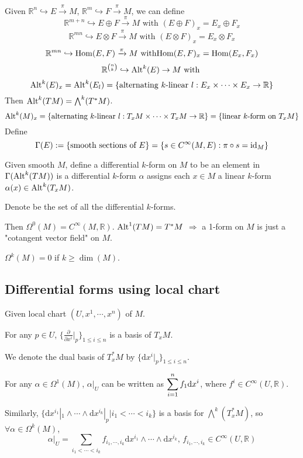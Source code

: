 Given  $ \mathbb{R}^n\hookrightarrow E\xrightarrow{\pi}M $,  $ \mathbb{R}^m\hookrightarrow F\xrightarrow{\pi}M $, we can define 
\[\mathbb{R}^{m+n}\hookrightarrow E\oplus F\xrightarrow{\pi}M\text{ with }(E\oplus F)_x=E_x\oplus F_x\]
\[\mathbb{R}^{mn}\hookrightarrow E\otimes F\xrightarrow{\pi}M\text{ with }(E\otimes F)_x=E_x\otimes F_x\]  
\[\mathbb{R}^{mn}\hookrightarrow \Hom(E,F)\xrightarrow{\pi}M\text{\ with}\Hom(E,F)_x=\Hom(E_x,F_x)\]
\[\mathbb{R}^{\binom{n }{k }}\hookrightarrow \mathrm{Alt}^k(E)\rightarrow M \text{ with }\]
\[\mathrm{Alt}^k(E)_x=\mathrm{Alt}^k(E_l)=\{\text{alternating  $ k $-linear } l:E_x\times \cdots\times E_x\rightarrow \mathbb{R}\}\]
Then  $ \mathrm{Alt}^k(TM)=\bigwedge^k(T^*M) $. 
\[\mathrm{Alt}^k(M)_x=\{\text{alternating  $ k $-linear } l:T_xM\times \cdots\times T_xM\rightarrow \mathbb{R}\}=\{\text{linear  $ k $-form on }T_xM\}\] 
Define 
\[\name{$ \Gamma(E) $}:=\{\text{smooth sections of }E\}=\{s\in C^\infty(M,E):\pi\circ s=\mathrm{id}_M\}\]
\begin{definition}
    Given smooth  $ M $, define a differential  $ k $-form on  $ M $ to be an element in  $ \Gamma(\mathrm{Alt}^k(TM)) $    is a differential  $ k $-form  $ \alpha $ assigns each  $ x\in M $ a linear  $ k $-form  $ \alpha(x)\in \mathrm{Alt}^k(T_xM) $.    
\end{definition}
Denote  be the set of all the differential  $ k $-forms.

Then  $ \Omega^0(M)=C^\infty(M,\mathbb{R}) $.  $ \mathrm{Alt}^1(TM)=T^*M $ $ \Rightarrow  $ a 1-form on  $ M $ is just a "cotangent vector field" on  $ M $.

 $ \Omega^k(M)=0 $ if  $ k \geq \dim (M) $.
\subsection{Differential forms using local chart}
Given local chart  $ (U,x^1,\cdots,x^n) $ of  $ M $.

For any  $ p\in U $,  $ \{\frac{\partial}{\partial x^i}|_p\}_{1 \leq i \leq n} $ is a basis of  $ T_xM $.

We  denote the dual basis of  $ T_x^*M $ by  $ \{\mathrm{d}x^i|_p\}_{1 \leq i \leq n} $.

For any  $ \alpha\in \Omega^1(M) $,  $ \alpha|_U $ can be written as  $ \displaystyle\sum_{i=1}^nf_1\mathrm{d}x^i $, where  $ f^i\in C^\infty(U,\mathbb{R}) $.

Similarly,  $ \{\mathrm{d} x^{i_1}|_1\wedge\cdots\wedge\mathrm{d}x^{i_k}|_p|i_1<\cdots<i_k\} $ is a basis for  $ \bigwedge^k(T_x^*M) $, so  $ \forall \alpha\in \Omega^k(M) $,
\[\alpha|_U=\sum_{i_1<\cdots<i_k}f_{i_1,\cdots,i_k}\mathrm{d} x^{i_1}\wedge\cdots\wedge\mathrm{d} x^{i_k},\,f_{i_1,\cdots,i_k}\in C^\infty(U,\mathbb{R})\]   